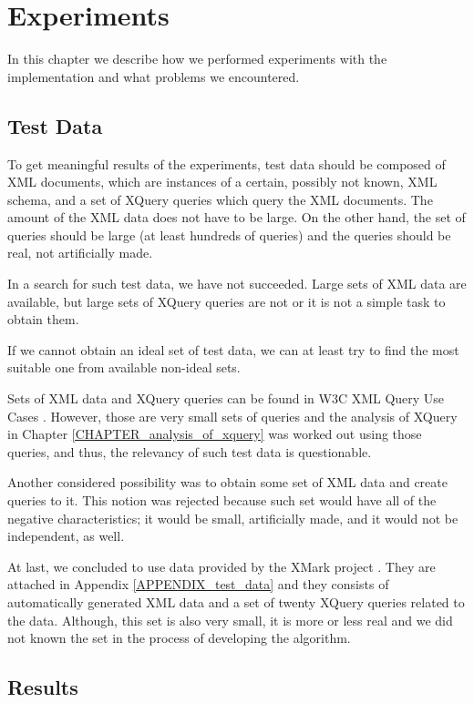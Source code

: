 \chapter{Experiments}
In this chapter we describe how we performed experiments with the implementation and what problems we encountered.

\section{Test Data}
To get meaningful results of the experiments, test data should be composed of XML documents, which are instances of a certain, possibly not known, XML schema, and a set of XQuery queries which query the XML documents. The amount of the XML data does not have to be large. On the other hand, the set of queries should be large (at least hundreds of queries) and the queries should be real, not artificially made.

In a search for such test data, we have not succeeded. Large sets of XML data are available, but large sets of XQuery queries are not or it is not a simple task to obtain them.

If we cannot obtain an ideal set of test data, we can at least try to find the most suitable one from available non-ideal sets.

Sets of XML data and XQuery queries can be found in W3C XML Query Use Cases \cite{Marchiori:07:XQU}. However, those are very small sets of queries and the analysis of XQuery in Chapter \ref{CHAPTER_analysis_of_xquery} was worked out using those queries, and thus, the relevancy of such test data is questionable.

Another considered possibility was to obtain some set of XML data and create queries to it. This notion was rejected because such set would have all of the negative characteristics; it would be small, artificially made, and it would not be independent, as well.

At last, we concluded to use data provided by the XMark project \cite{xmark}. They are attached in Appendix \ref{APPENDIX_test_data} and they consists of automatically generated XML data and a set of twenty XQuery queries related to the data. Although, this set is also very small, it is more or less real and we did not known the set in the process of developing the algorithm.

\section{Results}


